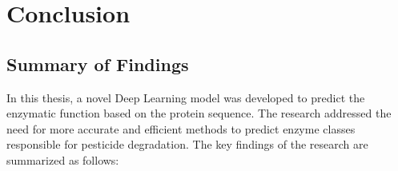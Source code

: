 \section{Conclusion}

\subsection{Summary of Findings}
\label{sec:Summary of Findings}

In this thesis, a novel Deep Learning model was developed to predict the enzymatic function based on the protein sequence. The research addressed the need for more accurate and efficient methods to predict enzyme classes responsible for pesticide degradation. The key findings of the research are summarized as follows:

